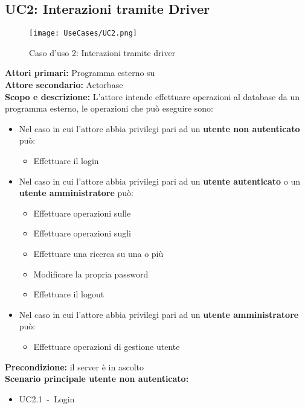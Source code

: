 \documentclass{scalatekids-article}
\begin{document}
\subsection{UC2: Interazioni tramite Driver}
\begin{figure}[H]
  \begin{center}
    \texttt{[image: UseCases/UC2.png]}
    \caption{Caso d'uso 2: Interazioni tramite driver}
  \end{center}
\end{figure}
\textbf{Attori primari:} Programma esterno su \\
\textbf{Attore secondario:} Actorbase\\
\textbf{Scopo e descrizione:} L'attore intende effettuare operazioni al database da un programma  esterno, le operazioni che può eseguire sono:
\begin{itemize} %
\item Nel caso in cui l'attore abbia privilegi pari ad un \textbf{utente non autenticato} può:
  \begin{itemize}
  \item Effettuare il login
  \end{itemize}
\item Nel caso in cui l'attore abbia privilegi pari ad un \textbf{utente autenticato} o un \textbf{utente amministratore} può:
  \begin{itemize}
  \item Effettuare operazioni sulle 
  \item Effettuare operazioni sugli 
  \item Effettuare una ricerca su una o più 
  \item Modificare la propria password
  \item Effettuare il logout
  \end{itemize}
\item Nel caso in cui l'attore abbia privilegi pari ad un \textbf{utente amministratore} può:
  \begin{itemize}
  \item Effettuare operazioni di gestione utente
  \end{itemize}
\end{itemize}
\textbf{Precondizione:} il server è in ascolto\\
\textbf{Scenario principale utente non autenticato:}
\begin{itemize}
\item UC2.1\ -\ Login
\end{itemize}
\end{document}
